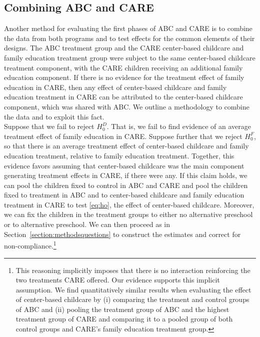\subsection{Combining ABC and CARE} \label{section:combine}

\noindent Another method for evaluating the first phases of ABC and CARE is to combine the data from both programs and to test effects for the common elements of their designs. The ABC treatment group and the CARE center-based childcare and family education treatment group were subject to the same center-based childcare treatment component, with the CARE children receiving an additional family education component. If there is no evidence for the treatment effect of family education in CARE, then any effect of center-based childcare and family education treatment in CARE can be attributed to the center-based childcare component, which was shared with ABC. We outline a methodology to combine the data and to exploit this fact.\\

\noindent Suppose that we fail to reject $H_{0}^D$. That is, we fail to find evidence of an average treatment effect of family education in CARE. Suppose further that we reject $H_{0}^F$, so that there is an average treatment effect of center-based childcare and family education treatment, relative to family education treatment. Together, this evidence favors assuming that center-based childcare was the main component generating treatment effects in CARE, if there were any. If this claim holds, we can pool the children fixed to control in ABC and CARE and pool the children fixed to treatment in ABC and to center-based childcare and family education treatment in CARE to test \eqref{eq:ho}, the effect of center-based childcare. Moreover, we can fix the children in the treatment groups to either no alternative preschool or to alternative preschool. We can then proceed as in Section~\ref{section:methodsquestions} to construct the estimates and correct for non-compliance.\footnote{This reasoning implicitly imposes that there is no interaction reinforcing the two treatments CARE offered. Our evidence supports this implicit assumption. We find quantitatively similar results when evaluating the effect of center-based childcare by (i) comparing the treatment and control groups of ABC and (ii) pooling the treatment group of ABC and the highest treatment group of CARE and comparing it to a pooled group of both control groups and CARE's family education treatment group.}\\

